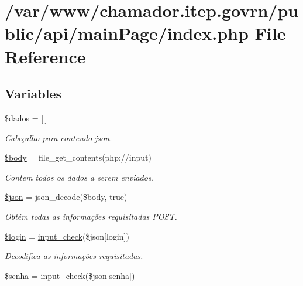 \hypertarget{main_page_2index_8php}{}\section{/var/www/chamador.itep.\+govrn/public/api/main\+Page/index.php File Reference}
\label{main_page_2index_8php}
\subsection*{Variables}
\begin{DoxyCompactItemize}
\item 
\hyperlink{main_page_2index_8php_a252370d95039a38fa11afab784725d58}{\$dados} = \mbox{[}$\,$\mbox{]}
\begin{DoxyCompactList}\small\item\em Cabeçalho para conteudo json. \end{DoxyCompactList}\item 
\hyperlink{main_page_2index_8php_a26b9f9373f7bb79dfcf8a86dff086b45}{\$body} = file\+\_\+get\+\_\+contents(\textquotesingle{}php\+://input\textquotesingle{})
\begin{DoxyCompactList}\small\item\em Contem todos os dados a serem enviados. \end{DoxyCompactList}\item 
\hyperlink{main_page_2index_8php_acedd13b51401130848ce18f4d5c52605}{\$json} = json\+\_\+decode(\$body, true)
\begin{DoxyCompactList}\small\item\em Obtém todas as informações requisitadas P\+O\+ST. \end{DoxyCompactList}\item 
\hyperlink{main_page_2index_8php_afc31993e855f9631572adfedcfe6f34b}{\$login} = \hyperlink{_header_8php_a8909d20d656fecf83ebaa2bed0cab2c1}{input\+\_\+check}(\$json\mbox{[}\textquotesingle{}login\textquotesingle{}\mbox{]})
\begin{DoxyCompactList}\small\item\em Decodifica as informações requisitadas. \end{DoxyCompactList}\item 
\hyperlink{main_page_2index_8php_a3678c8769c9698fd30581c1016c5f475}{\$senha} = \hyperlink{_header_8php_a8909d20d656fecf83ebaa2bed0cab2c1}{input\+\_\+check}(\$json\mbox{[}\textquotesingle{}senha\textquotesingle{}\mbox{]})

\end{DoxyCompactItemize}
